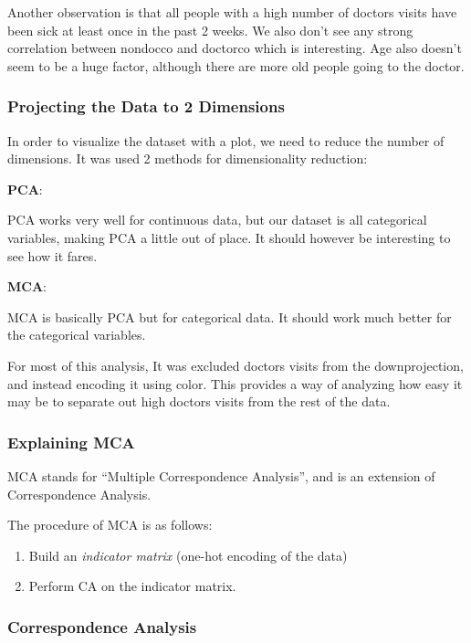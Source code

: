 \documentclass[
]{article}
\begin{document}
Another observation is that all people with a high number of doctors
visits have been sick at least once in the past 2 weeks. We also don't
see any strong correlation between nondocco and doctorco which is
interesting. Age also doesn't seem to be a huge factor, although there
are more old people going to the doctor.

\subsubsection{Projecting the Data to 2
Dimensions}\label{projecting-the-data-to-2-dimensions}

In order to visualize the dataset with a plot, we need to reduce the
number of dimensions. It was used 2 methods for dimensionality
reduction:

\textbf{PCA}:

PCA works very well for continuous data, but our dataset is all
categorical variables, making PCA a little out of place. It should
however be interesting to see how it fares.

\textbf{MCA}:

MCA is basically PCA but for categorical data. It should work much
better for the categorical variables.

For most of this analysis, It was excluded doctors visits from the
downprojection, and instead encoding it using color. This provides a way
of analyzing how easy it may be to separate out high doctors visits from
the rest of the data.

\subsubsection{Explaining MCA}\label{explaining-mca}

MCA stands for ``Multiple Correspondence Analysis'', and is an extension
of Correspondence Analysis.

The procedure of MCA is as follows:

\begin{enumerate}
\def\labelenumi{\arabic{enumi}.}
\item
  Build an \emph{indicator matrix} (one-hot encoding of the data)
\item
  Perform CA on the indicator matrix.
\end{enumerate}

\subsubsection{Correspondence Analysis}\label{correspondence-analysis}
\end{document}
